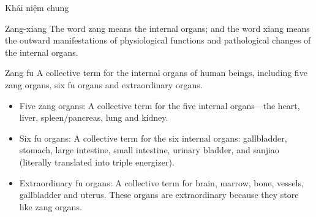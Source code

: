 \documentclass[
	11pt, %
]{beamer}
\theoremstyle{newblock}
\begin{document}
\begin{frame}{Khái niệm chung}
	\begin{block}{Zang-xiang}
		The word zang means the internal organs; and the word xiang means the outward manifestations of physiological functions and pathological changes of the internal organs. 
	\end{block}
	\begin{block}{Zang fu}
		A collective term for the internal organs of human beings, including five zang organs, six fu organs and extraordinary organs.
		\begin{itemize}
			\item Five zang organs: A collective term for the five internal organs—the heart, liver, spleen/pancreas, lung and kidney.
			\item Six fu organs: A collective term for the six internal organs: 
			gallbladder, stomach, large intestine, small intestine, urinary bladder, and sanjiao (literally translated into triple energizer).
			\item Extraordinary fu organs: A collective term for brain, marrow, bone, vessels, gallbladder and uterus. These organs are 
			extraordinary because they store like zang organs. 
		\end{itemize}
	\end{block}
\end{frame}
\end{document}
